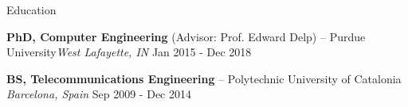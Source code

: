 \documentclass{resume} %
\begin{document}

\vspace{-5pt}
\begin{rSection}{Education}

{\bf PhD, Computer Engineering} ({\normalfont Advisor}: Prof. Edward Delp) -- Purdue University\hfill{\em West Lafayette, IN} \hfill {Jan 2015 - Dec 2018}
%


{\bf BS, Telecommunications Engineering}  -- Polytechnic University of Catalonia  \hfill { \em  Barcelona, Spain} 
 \hfill { Sep 2009 - Dec 2014}

\vspace{-1pt}

\end{rSection}

\end{document}
